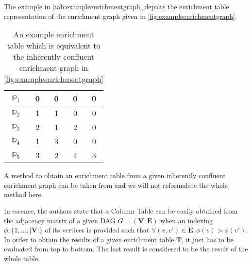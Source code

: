 The example in \autoref{tab:exampleenrichmentgraph} depicts the enrichment table representation of the enrichment graph given in \autoref{fig:exampleenrichmentgraph}.\\

\begin{table}[tb]
\caption[An example enrichment table]{An example enrichment table which is equivalent to the inherently confluent enrichment graph in \autoref{fig:exampleenrichmentgraph}}
\centering
\begin{tabular}{c|c|c|c|c}
  $\mathbb{p}_1$ & 0 & 0 & 0 & 0\\ \hline
  $\mathbb{p}_2$ & 1 & 1 & 0 & 0\\ \hline
  $\mathbb{p}_3$ & 2 & 1 & 2 & 0\\ \hline
  $\mathbb{p}_4$ & 1 & 3 & 0 & 0\\ \hline
  $\mathbb{p}_5$ & 3 & 2 & 4 & 3
\end{tabular}
\label{tab:exampleenrichmentgraph}
\end{table}

A method to obtain an enrichment table from a given inherently confluent enrichment graph can be taken from \cite{kvasnieka:1998a} and we will not reformulate the whole method here.

In essence, the authors state that a Column Table can be easily obtained from the adjacency matrix of a given \ac{DAG} $G=(\mathbf{V},\mathbf{E})$  when an indexing $\phi \colon \{1,\dots,|\mathbf{V}|\}$ of its vertices is provided such that $\forall(v,v')\in \mathbf{E} \colon \phi(v) > \phi(v')$.\\


In order to obtain the results of a given enrichment table $\mathbf{T}$, it just has to be evaluated from top to bottom.
The last result is considered to be the result of the whole table.

